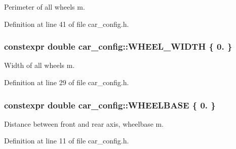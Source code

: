 Perimeter of all wheels  m. 



Definition at line 41 of file car\+\_\+config.\+h.

\subsubsection[{\texorpdfstring{W\+H\+E\+E\+L\+\_\+\+W\+I\+D\+TH}{WHEEL_WIDTH}}]{\setlength{\rightskip}{0pt plus 5cm}constexpr double car\+\_\+config\+::\+W\+H\+E\+E\+L\+\_\+\+W\+I\+D\+TH \{ 0. \}}\hypertarget{namespacecar__config_ace29186cd9605cde6edd0fd9b814df63}{}\label{namespacecar__config_ace29186cd9605cde6edd0fd9b814df63}


Width of all wheels  m. 



Definition at line 29 of file car\+\_\+config.\+h.

\subsubsection[{\texorpdfstring{W\+H\+E\+E\+L\+B\+A\+SE}{WHEELBASE}}]{\setlength{\rightskip}{0pt plus 5cm}constexpr double car\+\_\+config\+::\+W\+H\+E\+E\+L\+B\+A\+SE \{ 0. \}}\hypertarget{namespacecar__config_a4e9e4925d43a88de91b13bedafabce67}{}\label{namespacecar__config_a4e9e4925d43a88de91b13bedafabce67}


Distance between front and rear axis, wheelbase  m. 



Definition at line 11 of file car\+\_\+config.\+h.

